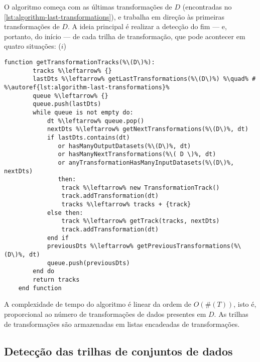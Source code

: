 
O algoritmo começa com as últimas transformações de \( D \) (encontradas no \autoref{lst:algorithm-last-transformations}), e trabalha em direção às primeiras transformações de \( D \). A ideia principal é realizar a detecção do fim --- e, portanto, do início --- de cada trilha de transformação, que pode acontecer em quatro situações: (\(i\)) 

\begin{minipage}[c]{\linewidth}
\begin{lstlisting}[language=pseudocode,label={lst:algorithm-transformation-tracks},caption={[Detecção das trilhas de transformações]Detecção do rastro do fluxo de dados no nível de trilhas de transformações.}]
    function getTransformationTracks(%\(D\)%):
        tracks %\leftarrow% {}
        lastDts %\leftarrow% getLastTransformations(%\(D\)%) %\quad% # %\autoref{lst:algorithm-last-transformations}%
        queue %\leftarrow% {}
        queue.push(lastDts)
        while queue is not empty do:
            dt %\leftarrow% queue.pop()
            nextDts %\leftarrow% getNextTransformations(%\(D\)%, dt)
            if lastDts.contains(dt)
               or hasManyOutputDatasets(%\(D\)%, dt)
               or hasManyNextTransformations(%\( D \)%, dt)
               or anyTransformationHasManyInputDatasets(%\(D\)%, nextDts)
               then:
                track %\leftarrow% new TransformationTrack()
                track.addTransformation(dt)
                tracks %\leftarrow% tracks + {track}
            else then:
                track %\leftarrow% getTrack(tracks, nextDts)
                track.addTransformation(dt)
            end if
            previousDts %\leftarrow% getPreviousTransformations(%\(D\)%, dt)
            queue.push(previousDts)
        end do
        return tracks
    end function
\end{lstlisting}
\end{minipage}

A complexidade de tempo do algoritmo é linear da ordem de \( O(\#(T)) \), isto é, proporcional ao número de transformações de dados presentes em \( D \). As trilhas de transformações são armazenadas em listas encadeadas de transformações.

\subsection{Detecção das trilhas de conjuntos de dados}


